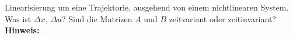 \begin{question}[section=2,name={Linearisierung um eine Trajektorie},difficulty=6,type=mdl,tags={}]
	Linearisierung um eine Trajektorie, ausgehend von einem nichtlinearen System. Was ist $\Delta x$, $\Delta u$? Sind die Matrizen $A$ und $B$ zeitvariant oder zeitinvariant?
	\\ \textbf{Hinweis:}\\
	
\end{question}
\begin{solution}
	
\end{solution}